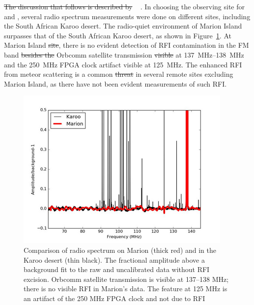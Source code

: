 \st{The discussion that follows is described by} ~\citet{2019JAI.....850004P} . In choosing the observing site for \prizm\  and \albatros, several radio spectrum measurements were done on different sites, including the South African Karoo desert. The radio-quiet environment of Marion Island surpasses that of the South African Karoo desert, as shown in Figure~\ref{fig:karoo}. At Marion Island \st{site}, there is no evident detection of RFI contamination in the FM band \st{besides the} Orbcomm satellite transmission \st{visible} at \SIrange{137}{138}{\mega\hertz} and the \SI{250}{\mega\hertz} FPGA clock artifact visible at \SI{125}{\mega\hertz}. The enhanced RFI from meteor scattering  is a common \st{threat}  in several remote sites excluding Marion Island, as there have not been evident measurements of such RFI.

\begin{figure}
	\centering
	\includegraphics[width=\linewidth]{Figures/karoo}
	\caption{Comparison of radio spectrum on Marion (thick red) and in the Karoo desert (thin black). The fractional amplitude above a background fit to the raw and uncalibrated data without RFI excision. Orbcomm satellite transmission is visible at 137–138 MHz; there is no visible RFI in Marion's data. The feature at 125 MHz is an artifact of the 250 MHz FPGA clock and not due to RFI~\citep{2019JAI.....850004P}}
	\label{fig:karoo}
\end{figure}


